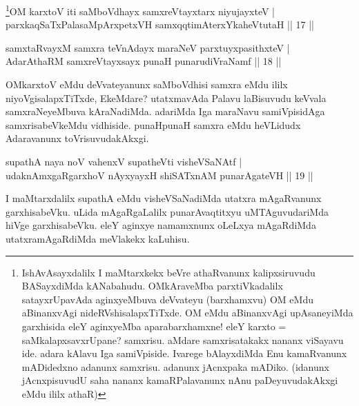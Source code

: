 \begin{shl}
\footnote{IshAvAsayxdalilx I maMtarxkekx beVre athaRvanunx kalipxsiruvudu BASayxdiMda kANabahudu. OMkAraveMba parxtiVkadalilx satayxrUpavAda aginxyeMbuva deVvateyu (barxhamxvu) OM eMdu aBinanxvAgi nideRVshisalapxTiTxde. OM eMdu aBinanxvAgi upAsaneyiMda garxhisida eleY aginxyeMba aparabarxhamxne! eleY karxto = saMkalapxsavxrUpane? samxrisu. aMdare samxrisatakakx nananx viSayavu ide. adara kAlavu Iga samiVpiside. Ivarege bAlayxdiMda Enu kamaRvanunx mADidedxno adanunx samxrisu. adanunx jAcnxpaka mADiko. (idanunx jAcnxpisuvudU saha nananx kamaRPalavanunx nAnu paDeyuvudakAkxgi eMdu ililx athaR)}OM karxtoV iti saMboVdhayx samxreVtayxtarx niyujayxteV | \\
parxkaqSaTxPalasaMpArxpetxVH samxqqtimAterxYkaheVtutaH \hfill||  17 || 
\end{shl}

\begin{shl}
samxtaRvayxM samxra teVnAdayx maraNeV parxtuyxpasithxteV | \\
AdarAthaRM samxreVtayxsayx punaH punarudiVraNamf \hfill||  18 || 
\end{shl}

\begin{artha} 
OMkarxtoV eMdu deVvateyanunx saMboVdhisi samxra eMdu ililx 
niyoVgisalapxTiTxde, EkeMdare? utatxmavAda Palavu laBisuvudu keVvala 
samxraNeyeMbuva kAraNadiMda. adariMda Iga maraNavu samiVpisidAga 
samxrisabeVkeMdu vidhiside. punaHpunaH samxra eMdu heVLidudx 
Adaravanunx toVrisuvudakAkxgi.
\end{artha}


\begin{shl}
supathA naya noV vahenxV supatheVti visheVSaNAtf | \\
udaknAmxgaRgarxhoV nAyxyayxH shiSATxnAM punarAgateVH \hfill||  19 || 
\end{shl}

\begin{artha} 
I maMtarxdalilx supathA eMdu visheVSaNadiMda utatxra mAgaRvanunx 
garxhisabeVku. uLida mAgaRgaLalilx punarAvaqtitxyu uMTAguvudariMda 
hiVge garxhisabeVku. eleY aginxye namamxnunx oLeLxya mAgaRdiMda 
utatxramAgaRdiMda meVlakekx kaLuhisu.
\end{artha}


